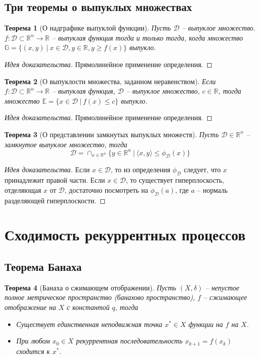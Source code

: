 \documentclass[10pt,a4paper]{article}
\newtheorem{theorem_ru}{Теорема}[section]
\newenvironment{sketch}
    {\begin{proof}[Идея доказательства]
    }
    { 
    \end{proof}
    }
\begin{document}
\subsection{Три теоремы о выпуклых множествах}
\begin{theorem_ru}[О надграфике выпуклой функции]
Пусть $\mathcal{D}$ -- выпуклое множество.
$f:\mathcal{D}\subset \mathbb{R}^n\rightarrow \mathbb{R}$ -- выпуклая функция тогда и только тогда, когда множество $\mathbb{G}=\{(x, y)~|~x\in \mathcal{D}, y\in \mathbb{R}, y\geq f(x)\}$ выпукло.
\end{theorem_ru}
\begin{sketch}
Прямолинейное применение определения.
\end{sketch}
\begin{theorem_ru}[О выпуклости множества, заданном неравенством]
Если $f:\mathcal{D}\subset \mathbb{R}^n\rightarrow \mathbb{R}$ -- выпуклая функция, $\mathcal{D}$ -- выпуклое множество, $c\in \mathbb{R}$, тогда множество $\mathbb{E}=\{x\in \mathcal{D}~|~f(x)\leq c\}$ выпукло.
\end{theorem_ru}
\begin{sketch}
Прямолинейное применение определения.
\end{sketch}
\begin{theorem_ru}[О представлении замкнутых выпуклых множеств]
Пусть $\mathcal{D}\in \mathbb{R}^n$ -- замкнутое выпуклое множество, тогда 
$$
\mathcal{D}=\cap_{x\in \mathbb{R}^n}\{y\in \mathbb{R}^n~|~\langle x, y\rangle\leq \phi_\mathcal{D}(x)\}
$$
\end{theorem_ru}
\begin{sketch}
Если $x\in \mathcal{D}$, то из определения $\phi_\mathcal{D}$ следует, что $x$ принадлежит правой части. Если $x\in \mathcal{D}$, то существует гиперплоскость, отделяющая $x$ от $\mathcal{D}$, достаточно посмотреть на $\phi_\mathcal{D}(a)$, где $a$ -- нормаль разделяющей гиперплоскости.
\end{sketch}

\section{Сходимость рекуррентных процессов}
\subsection{Теорема Банаха}
\begin{theorem_ru}[Банаха о сжимающем отображении]
Пусть $(X, \delta)$ -- непустое полное метрическое пространство (банахово пространство), $f$ -- сжимающее отображение на $X$ с константой $q$, тогда 
\begin{itemize}
\item Существует единственная неподвижная точка $x^*\in X$ функции на $f$ на $X$.
\item При любом $x_0\in X$ рекуррентная последовательность $x_{k+1}=f(x_k)$ сходится к $x^*$.
\end{itemize} 
\end{theorem_ru}
\end{document}
